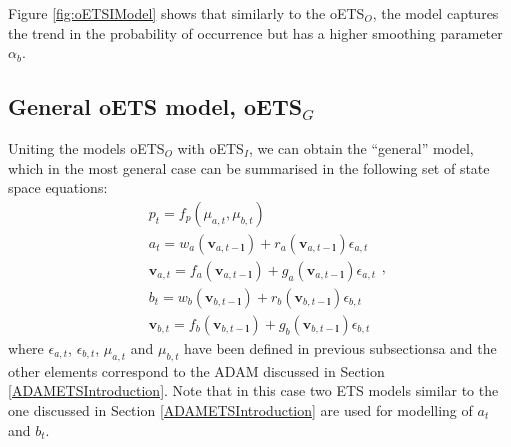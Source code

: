\documentclass[]{book}
\theoremstyle{definition}
\theoremstyle{definition}
\theoremstyle{definition}
\theoremstyle{definition}
\theoremstyle{remark}
\begin{document}
Figure \ref{fig:oETSIModel} shows that similarly to the oETS\(_O\), the model captures the trend in the probability of occurrence but has a higher smoothing parameter \(\alpha_b\).

\hypertarget{oETSG}{%
\subsection{\texorpdfstring{General oETS model, oETS\(_G\)}{General oETS model, oETS\_G}}\label{oETSG}}

Uniting the models oETS\(_O\) with oETS\(_I\), we can obtain the ``general'' model, which in the most general case can be summarised in the following set of state space equations:
\begin{equation}
\begin{aligned}
& p_t = f_p(\mu_{a,t}, \mu_{b,t}) \\
& a_t = w_a(\mathbf{v}_{a,t-\mathbf{l}}) + r_a(\mathbf{v}_{a,t-\mathbf{l}}) \epsilon_{a,t} \\
& \mathbf{v}_{a,t} = f_a(\mathbf{v}_{a,t-\mathbf{l}}) + g_a(\mathbf{v}_{a,t-\mathbf{l}}) \epsilon_{a,t} \\
& b_t = w_b(\mathbf{v}_{b,t-\mathbf{l}}) + r_b(\mathbf{v}_{b,t-\mathbf{l}}) \epsilon_{b,t} \\
& \mathbf{v}_{b,t} = f_b(\mathbf{v}_{b,t-\mathbf{l}}) + g_b(\mathbf{v}_{b,t-\mathbf{l}}) \epsilon_{b,t}
\end{aligned} ,
\label{eq:oETSG}
\end{equation}
where \(\epsilon_{a,t}\), \(\epsilon_{b,t}\), \(\mu_{a,t}\) and \(\mu_{b,t}\) have been defined in previous subsectionsa and the other elements correspond to the ADAM discussed in Section \ref{ADAMETSIntroduction}. Note that in this case two ETS models similar to the one discussed in Section \ref{ADAMETSIntroduction} are used for modelling of \(a_t\) and \(b_t\).
\end{document}
